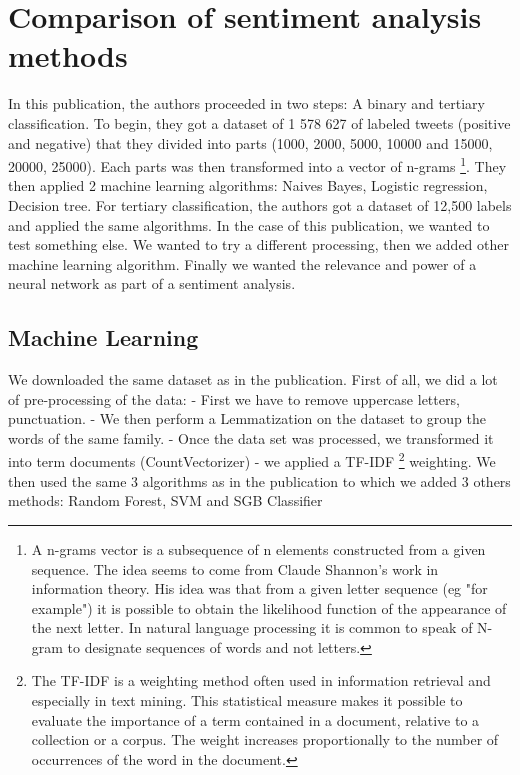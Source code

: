 \documentclass{acmtog} %
\begin{document}
\section{Comparison of sentiment analysis methods}
\label{sec:comparison}
In this publication, the authors proceeded in two steps: A binary and tertiary classification. To begin, they got a dataset of 1 578 627 of labeled tweets (positive and negative) that they divided into parts (1000, 2000, 5000, 10000 and 15000, 20000, 25000). Each parts was then transformed into a vector of n-grams \footnote{ A n-grams vector is a subsequence of n elements constructed from a given sequence. The idea seems to come from Claude Shannon's work in information theory. His idea was that from a given letter sequence (eg "for example") it is possible to obtain the likelihood function of the appearance of the next letter. In natural language processing it is common to speak of N-gram to designate sequences of words and not letters.}. They then applied 2 machine learning algorithms: Naives Bayes, Logistic regression, Decision tree. For tertiary classification, the authors got a dataset of 12,500 labels and applied the same algorithms. 
In the case of this publication, we wanted to test something else. We wanted to try a different processing, then we added other machine learning algorithm. Finally we wanted the relevance and power of a neural network as part of a sentiment analysis.

\subsection{Machine Learning}
We downloaded the same dataset as in the publication. First of all, we did a lot of pre-processing of the data: 
- First we have to remove uppercase letters, punctuation. 
- We then perform a Lemmatization on the dataset to group the words of the same family. 
- Once the data set was processed, we transformed it into term documents (CountVectorizer) 
- we applied a TF-IDF \footnote{The TF-IDF is a weighting method often used in information retrieval and especially in text mining. This statistical measure makes it possible to evaluate the importance of a term contained in a document, relative to a collection or a corpus. The weight increases proportionally to the number of occurrences of the word in the document.} weighting. 
We then used the same 3 algorithms as in the publication to which we added 3 others methods: Random Forest, SVM and SGB Classifier
\end{document}
